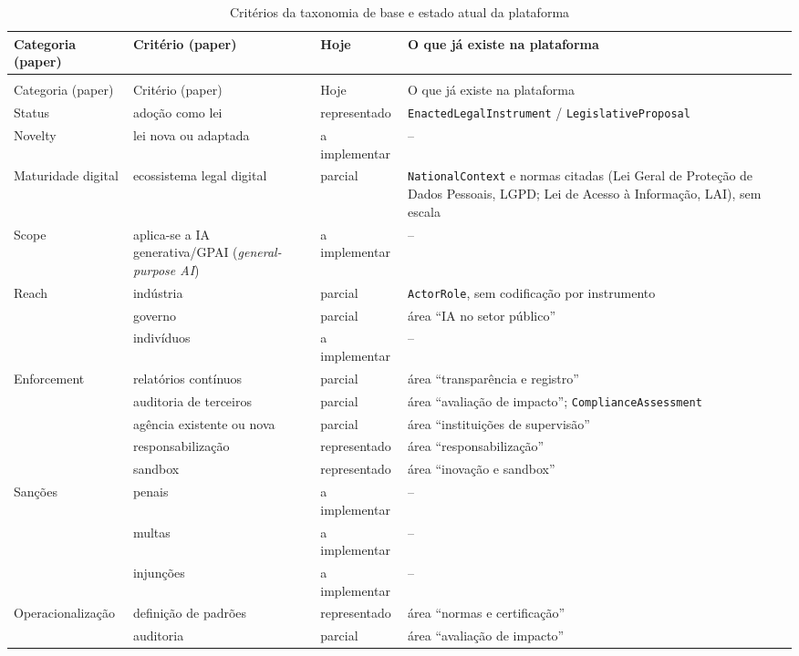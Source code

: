 \documentclass[12pt,a4paper,oneside,english,brazil]{abntex2}
\begin{document}
{\footnotesize
\begin{longtable}{>{\raggedright\arraybackslash}p{30mm} >{\raggedright\arraybackslash}p{34mm} l >{\raggedright\arraybackslash}p{58mm}}
\caption{Critérios da taxonomia de base e estado atual da plataforma}\label{tab:criterios}\\
\toprule
Categoria (paper) & Critério (paper) & Hoje & O que já existe na plataforma\\
\midrule\endfirsthead
\multicolumn{4}{l}{(continuação)}\\
\toprule
Categoria (paper) & Critério (paper) & Hoje & O que já existe na plataforma\\
\midrule\endhead
\bottomrule\endlastfoot
Status & adoção como lei & representado & \texttt{EnactedLegalInstrument} / \texttt{LegislativeProposal}\\
Novelty & lei nova ou adaptada & a implementar & --\\
Maturidade digital & ecossistema legal digital & parcial & \texttt{NationalContext} e normas citadas (Lei Geral de Proteção de Dados Pessoais, LGPD; Lei de Acesso à Informação, LAI), sem escala\\
Scope & aplica-se a IA generativa/GPAI (\emph{general-purpose AI}) & a implementar & --\\
Reach & indústria & parcial & \texttt{ActorRole}, sem codificação por instrumento\\
 & governo & parcial & área ``IA no setor público''\\
 & indivíduos & a implementar & --\\
Enforcement & relatórios contínuos & parcial & área ``transparência e registro''\\
 & auditoria de terceiros & parcial & área ``avaliação de impacto''; \texttt{ComplianceAssessment}\\
 & agência existente ou nova & parcial & área ``instituições de supervisão''\\
 & responsabilização & representado & área ``responsabilização''\\
 & sandbox & representado & área ``inovação e sandbox''\\
Sanções & penais & a implementar & --\\
 & multas & a implementar & --\\
 & injunções & a implementar & --\\
Operacionalização & definição de padrões & representado & área ``normas e certificação''\\
 & auditoria & parcial & área ``avaliação de impacto''\\

\end{longtable}}
\end{document}
